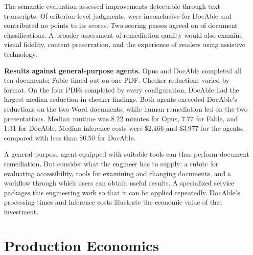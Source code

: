 The semantic evaluation assessed improvements detectable through text transcripts. Of  criterion-level judgments,  were inconclusive for DocAble and contributed no points to its scores. Two scoring passes agreed on  of  document classifications. A broader assessment of remediation quality would also examine visual fidelity, content preservation, and the experience of readers using assistive technology.

\textbf{Results against general-purpose agents.} Opus and DocAble completed all ten documents; Fable timed out on one PDF. Checker reductions varied by format. On the four PDFs completed by every configuration, DocAble had the largest median reduction in checker findings. Both agents exceeded DocAble's reductions on the two Word documents, while human remediation led on the two presentations. Median runtime was 8.22 minutes for Opus, 7.77 for Fable, and 1.31 for DocAble. Median inference costs were \$2.466 and \$3.977 for the agents, compared with less than \$0.50 for DocAble.

A general-purpose agent equipped with suitable tools can thus perform document remediation. But consider what the engineer has to supply: a rubric for evaluating accessibility, tools for examining and changing documents, and a workflow through which users can obtain useful results. A specialized service packages this engineering work so that it can be applied repeatedly. DocAble's processing times and inference costs illustrate the economic value of that investment.

\section{Production Economics}\label{heading:runtime-and-cost}

